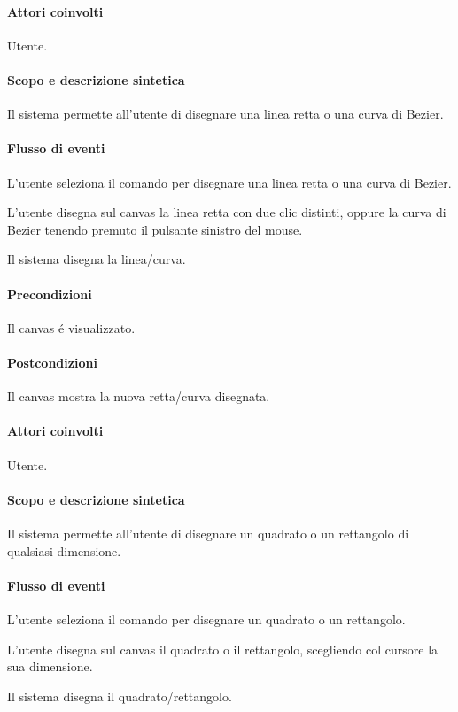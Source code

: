 \paragraph{Attori coinvolti} Utente.
\paragraph{Scopo e descrizione sintetica} 
Il sistema permette all'utente di disegnare una linea retta o una curva di Bezier.
\paragraph{Flusso di eventi}
\begin{elenconumerato}[\textbf{}]{\subsubsecindent}
\item L'utente seleziona il comando per disegnare una linea retta o una curva di Bezier.
\item L'utente disegna sul canvas la linea retta con due clic distinti, oppure la curva di Bezier tenendo premuto il pulsante sinistro del mouse.
\item Il sistema disegna la linea/curva.
\end{elenconumerato}
\paragraph{Precondizioni} Il canvas \'e visualizzato.
\paragraph{Postcondizioni} Il canvas mostra la nuova retta/curva disegnata.

\paragraph{Attori coinvolti} Utente.
\paragraph{Scopo e descrizione sintetica} 
Il sistema permette all'utente di disegnare un quadrato o un rettangolo di qualsiasi dimensione.
\paragraph{Flusso di eventi}
\begin{elenconumerato}[\textbf{}]{\subsubsecindent}
\item L'utente seleziona il comando per disegnare un quadrato o un rettangolo.
\item L'utente disegna sul canvas il quadrato o il rettangolo, scegliendo col cursore la sua dimensione.
\item Il sistema disegna il quadrato/rettangolo.
\end{elenconumerato}
